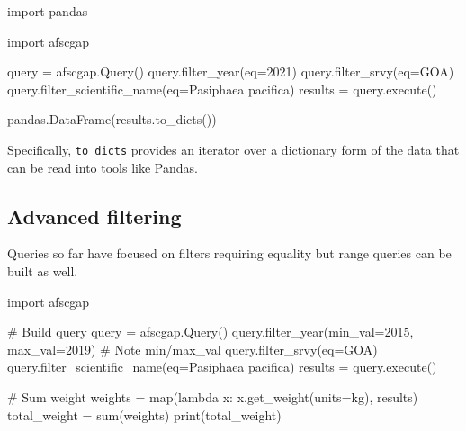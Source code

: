 \documentclass[
  letterpaper,
  oneside,
  open=any]{scrbook}
\newenvironment{Shaded}{\begin{snugshade}}{\end{snugshade}}
\newcommand{\AttributeTok}[1]{\textcolor[rgb]{0.40,0.45,0.13}{#1}}
\newcommand{\CommentTok}[1]{\textcolor[rgb]{0.37,0.37,0.37}{#1}}
\newcommand{\DecValTok}[1]{\textcolor[rgb]{0.68,0.00,0.00}{#1}}
\newcommand{\FunctionTok}[1]{\textcolor[rgb]{0.28,0.35,0.67}{#1}}
\newcommand{\NormalTok}[1]{\textcolor[rgb]{0.00,0.23,0.31}{#1}}
\newcommand{\OtherTok}[1]{\textcolor[rgb]{0.00,0.23,0.31}{#1}}
\newcommand{\SpecialCharTok}[1]{\textcolor[rgb]{0.37,0.37,0.37}{#1}}
\newcommand{\StringTok}[1]{\textcolor[rgb]{0.13,0.47,0.30}{#1}}
\begin{document}
\begin{Shaded}
\begin{Highlighting}[]
\NormalTok{import pandas}

\NormalTok{import afscgap}

\NormalTok{query }\OtherTok{=} \FunctionTok{afscgap.Query}\NormalTok{()}
\FunctionTok{query.filter\_year}\NormalTok{(}\AttributeTok{eq=}\DecValTok{2021}\NormalTok{)}
\FunctionTok{query.filter\_srvy}\NormalTok{(}\AttributeTok{eq=}\StringTok{\textquotesingle{}GOA\textquotesingle{}}\NormalTok{)}
\FunctionTok{query.filter\_scientific\_name}\NormalTok{(}\AttributeTok{eq=}\StringTok{\textquotesingle{}Pasiphaea pacifica\textquotesingle{}}\NormalTok{)}
\NormalTok{results }\OtherTok{=} \FunctionTok{query.execute}\NormalTok{()}

\FunctionTok{pandas.DataFrame}\NormalTok{(}\FunctionTok{results.to\_dicts}\NormalTok{())}
\end{Highlighting}
\end{Shaded}

Specifically, \texttt{to\_dicts} provides an iterator over a dictionary
form of the data that can be read into tools like Pandas.

\hypertarget{advanced-filtering}{%
\subsection{Advanced filtering}\label{advanced-filtering}}

Queries so far have focused on filters requiring equality but range
queries can be built as well.

\begin{Shaded}
\begin{Highlighting}[]
\NormalTok{import afscgap}

\CommentTok{\# Build query}
\NormalTok{query }\OtherTok{=} \FunctionTok{afscgap.Query}\NormalTok{()}
\FunctionTok{query.filter\_year}\NormalTok{(}\AttributeTok{min\_val=}\DecValTok{2015}\NormalTok{, }\AttributeTok{max\_val=}\DecValTok{2019}\NormalTok{)   }\CommentTok{\# Note min/max\_val}
\FunctionTok{query.filter\_srvy}\NormalTok{(}\AttributeTok{eq=}\StringTok{\textquotesingle{}GOA\textquotesingle{}}\NormalTok{)}
\FunctionTok{query.filter\_scientific\_name}\NormalTok{(}\AttributeTok{eq=}\StringTok{\textquotesingle{}Pasiphaea pacifica\textquotesingle{}}\NormalTok{)}
\NormalTok{results }\OtherTok{=} \FunctionTok{query.execute}\NormalTok{()}

\CommentTok{\# Sum weight}
\NormalTok{weights }\OtherTok{=} \FunctionTok{map}\NormalTok{(lambda x}\SpecialCharTok{:} \FunctionTok{x.get\_weight}\NormalTok{(}\AttributeTok{units=}\StringTok{\textquotesingle{}kg\textquotesingle{}}\NormalTok{), results)}
\NormalTok{total\_weight }\OtherTok{=} \FunctionTok{sum}\NormalTok{(weights)}
\FunctionTok{print}\NormalTok{(total\_weight)}
\end{Highlighting}
\end{Shaded}
\end{document}
